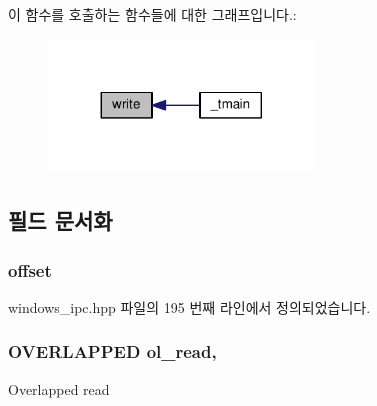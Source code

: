 이 함수를 호출하는 함수들에 대한 그래프입니다.\+:
\nopagebreak
\begin{figure}[H]
\begin{center}
\leavevmode
\includegraphics[width=200pt]{class_windows_n_pipe_message_a1a6e0ed523a40350e1e0c44510d9caab_icgraph}
\end{center}
\end{figure}




\subsection{필드 문서화}
\subsubsection[{\texorpdfstring{offset}{offset}}]{ offset\hspace{0.3cm}{\ttfamily [private]}}\hypertarget{class_win_n_pipe_offset_update_message_adc97734c3146947e87902755f386597d}{}\label{class_win_n_pipe_offset_update_message_adc97734c3146947e87902755f386597d}


windows\+\_\+ipc.\+hpp 파일의 195 번째 라인에서 정의되었습니다.

\subsubsection[{\texorpdfstring{ol\+\_\+read}{ol_read}}]{\setlength{\rightskip}{0pt plus 5cm}O\+V\+E\+R\+L\+A\+P\+P\+ED ol\+\_\+read\hspace{0.3cm}{\ttfamily [protected]}, {\ttfamily [inherited]}}\hypertarget{class_windows_n_pipe_message_a710906aa9e22a9cb7a3f1527445f9825}{}\label{class_windows_n_pipe_message_a710906aa9e22a9cb7a3f1527445f9825}
Overlapped read 

